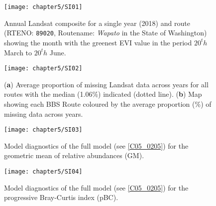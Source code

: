 \begin{figure}[htb]
\centering
\texttt{[image: chapter5/SI01]}
\caption{Annual Landsat composite for a single year (2018) and route (RTENO: \texttt{89020}, Routename: \textit{Wapato} in the State of Washington) showing the month with the greenest EVI value in the period $20^th$ March to $20^th$ June. }
\label{SI05_01}
\end{figure}

\begin{figure}[htb]
\centering
\texttt{[image: chapter5/SI02]}
\caption{(\textbf{a}) Average proportion of missing Landsat data across years for all routes with the median (1.06\%) indicated (dotted line). (\textbf{b}) Map showing each BBS Route coloured by the average proportion (\%) of missing data across years.}
\label{SI05_02}
\end{figure}

\begin{figure}[htb]
\centering
\texttt{[image: chapter5/SI03]}
\caption{Model diagnostics of the full model (see \ref{C05_0205}) for the geometric mean of relative abundances (GM).}
\label{SI05_03}
\end{figure}

\begin{figure}[htb]
\centering
\texttt{[image: chapter5/SI04]}
\caption{Model diagnostics of the full model (see \ref{C05_0205}) for the progressive Bray-Curtis index (pBC).}
\label{SI05_04}
\end{figure}